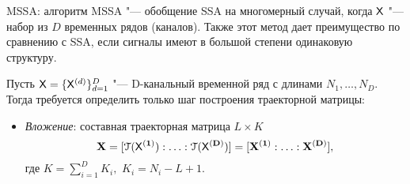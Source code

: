 \documentclass[ucs, notheorems, handout]{beamer}
\begin{document}
\begin{frame}{MSSA: алгоритм}
	MSSA "--- обобщение SSA на многомерный случай, когда $\mathsf{X}$ "--- набор из $D$ временных рядов (каналов). Также этот метод дает преимущество по сравнению с SSA, если сигналы имеют в большой степени одинаковую структуру. \medskip
	
	Пусть $\mathsf{X}=\{\mathsf{X}^{(d)}\}_{d=1}^D$ "--- D-канальный временной ряд с длинами $N_1,\ldots,N_D$. Тогда требуется определить только шаг построения траекторной матрицы:\medskip
	
	\begin{itemize}
		\item \emph{Вложение}: составная траекторная матрица $L\times K$  $$\bf{X}=[\EuScript{T}(\mathsf{X}^{(1)}):\ldots:\EuScript{T}(\mathsf{X}^{(D)})]=[\mathbf{X}^{(1)}:\ldots:\mathbf{X}^{(D)}],$$ где $K=\sum_{i=1}^D K_i,$ $K_i=N_i-L+1$.
		
	\end{itemize}
			
\end{frame}
\end{document}

